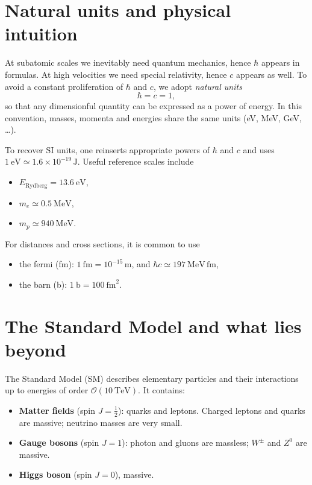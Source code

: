 \section{Natural units and physical intuition}
At subatomic scales we inevitably need quantum mechanics, hence $\hbar$ appears in formulas.
At high velocities we need special relativity, hence $c$ appears as well. To avoid a
constant proliferation of $\hbar$ and $c$, we adopt \emph{natural units}
\begin{equation}
\hbar = c = 1,
\end{equation}
so that any dimensionful quantity can be expressed as a power of energy. In this convention,
masses, momenta and energies share the same units (eV, MeV, GeV, \dots).

To recover SI units, one reinserts appropriate powers of $\hbar$ and $c$ and uses
$1~\text{eV} \simeq 1.6\times 10^{-19}\,\text{J}$. Useful reference scales include
\begin{itemize}
  \item $E_{\text{Rydberg}}=13.6~\text{eV}$,
  \item $m_e\simeq 0.5~\text{MeV}$,
  \item $m_p\simeq 940~\text{MeV}$.
\end{itemize}
For distances and cross sections, it is common to use
\begin{itemize}
  \item the fermi (fm): $1~\text{fm}=10^{-15}\,\text{m}$, and $\hbar c\simeq 197~\text{MeV}\,\text{fm}$,
  \item the barn (b): $1~\text{b}=100~\text{fm}^2$.
\end{itemize}

\section{The Standard Model and what lies beyond}
The Standard Model (SM) describes elementary particles and their interactions up to energies
of order $\mathcal{O}(10~\text{TeV})$. It contains:
\begin{itemize}
  \item \textbf{Matter fields} (spin $J=\tfrac{1}{2}$): quarks and leptons. Charged leptons and quarks are massive; neutrino masses are very small.
  \item \textbf{Gauge bosons} (spin $J=1$): photon and gluons are massless; $W^\pm$ and $Z^0$ are massive.
  \item \textbf{Higgs boson} (spin $J=0$), massive.
\end{itemize}

